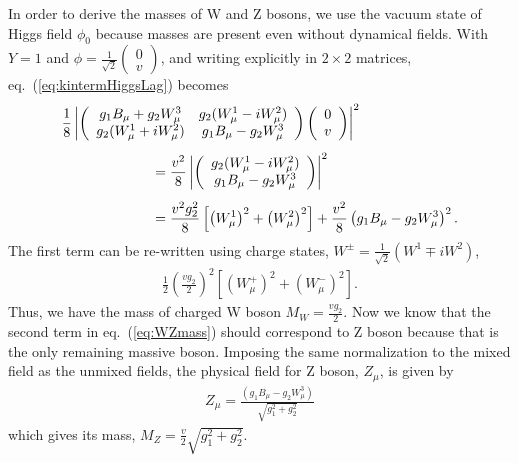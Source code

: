 In order to derive the masses of W and Z bosons, we use the vacuum state of Higgs field $\phi_0$
because masses are present even without dynamical fields.  
With $Y=1$ and $\displaystyle \phi = \frac{1}{\sqrt{2}} 
\left(  \begin{array}{c} 0 \\ v \end{array} \right)$, 
and writing explicitly in $2\times2$ matrices, eq.~(\ref{eq:kintermHiggsLag}) becomes 
\begin{eqnarray}
\label{eq:WZmass}
\begin{array}{ccc} \multicolumn{2}{c}{ \displaystyle \vspace{0.3cm}   
\frac{1}{8} \left| \left(  \begin{array}{cc} 
g_1 B_\mu + g_2 W_\mu^3     & g_2 (W_\mu^1 - iW_\mu^2) \\
g_2 (W_\mu^1 + iW_\mu^2)    & g_1 B_\mu - g_2 W_\mu^3 \end{array} \right) 
\left(  \begin{array}{c} 0 \\ v \end{array} \right) \right|^2 
} & \\ & \multicolumn{2}{l}{\hspace{2cm} \vspace{0.3cm} \displaystyle   
= \frac{v^2}{8} \left| \left(  \begin{array}{c} 
g_2 (W_\mu^1 - iW_\mu^2) \\
g_1 B_\mu - g_2 W_\mu^3 
\end{array} \right) \right|^2} \\  
& \multicolumn{2}{l}{\hspace{2cm}  \displaystyle   
=   
\frac{v^2 g_2^2}{8} \left[ \left( W_\mu^1 \right)^2  + \left( W_\mu^2 \right)^2 \right] 
+ \frac{v^2}{8} \left( g_1 B_\mu - g_2 W_\mu^3 \right)^2.
} \end{array}    
\end{eqnarray} 
The first term can be re-written using charge states, 
$\displaystyle W^\pm = \frac{1}{\sqrt{2}} \left( W^1 \mp iW^2 \right)$, 
\begin{eqnarray}
\frac{1}{2} \left( \frac{v g_2}{2} \right)^2 
\left[ \left( W_\mu^+ \right)^2  + \left( W_\mu^- \right)^2 \right]. 
\end{eqnarray} 
Thus, we have the mass of charged W boson $\displaystyle M_W = \frac{v g_2}{2}$.
Now we know that the second term in eq.~(\ref{eq:WZmass}) should correspond to 
Z boson because that is the only remaining massive boson. Imposing the same 
normalization to the mixed field as the unmixed fields, the physical field for 
Z boson, $Z_\mu$, is given by
\begin{eqnarray} 
Z_\mu = \frac{\left( g_1 B_\mu - g_2 W_\mu^3 \right)}{\sqrt{g_1^2+g_2^2}}  
\end{eqnarray} 
which gives its mass, $\displaystyle M_Z = \frac{v}{2} \sqrt{g_1^2+g_2^2}$. 

